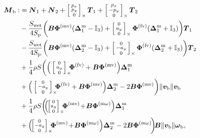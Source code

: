 \begin{align} 
\label{eq:Mb}
 \boldsymbol{M}_{\text{b}} :&=\boldsymbol{N}_{1} + \boldsymbol{N}_{2} + \skewsym{\smallm{p_x\\ p_y\\ 0}} \boldsymbol{T}_{1} + \skewsym{\smallm{p_x\\ - p_y\\ 0}} \boldsymbol{T}_{2}\\
    \nonumber
  &- \frac{S_{\text{wet}}}{4S_{\text{p}}} \bigg( \boldsymbol{B} \boldsymbol{\Phi}^{\text{(mv)}} (\boldsymbol{\Delta}^{\text{m}}_1- \mathbb{I}_{3} ) + \skewsym{\smallm{0 \\ a_y \\ 0}} \boldsymbol{\Phi}^{\text{(fv)}} (\boldsymbol{\Delta}^{\text{m}}_1 +\mathbb{I}_{3} ) \bigg) \boldsymbol{T}_{1} \\
    \nonumber
  & - \frac{S_{\text{wet}}}{4S_{\text{p}}} \bigg( \boldsymbol{B} \boldsymbol{\Phi}^{\text{(mv)}} (\boldsymbol{\Delta}^{\text{m}}_2 - \mathbb{I}_{3} ) +  \skewsym{\smallm{0 \\ - a_y \\ 0}} \boldsymbol{\Phi}^{\text{(fv)}} (\boldsymbol{\Delta}^{\text{m}}_2 + \mathbb{I}_{3}) \bigg) \boldsymbol{T}_{2} \\
    \nonumber
  & + \frac{1}{4} \rho S  \bigg( \Big(\skewsym{\smallm{0 \\ a_y \\ 0}} \!\!\! \boldsymbol{\Phi}^{\text{(fv)}}  + \boldsymbol{B} \boldsymbol{\Phi}^{\text{(mv)}} \Big) \boldsymbol{\Delta}^{\text{m}}_1 \\
    \nonumber
  &  + \Big( \skewsym{\smallm{0 \\ - a_y \\ 0}} \!\!\! \boldsymbol{\Phi}^{\text{(fv)}} + \boldsymbol{B} \boldsymbol{\Phi}^{\text{(mv)}}  \Big) \boldsymbol{\Delta}^{\text{m}}_2 - 2 \boldsymbol{B} \boldsymbol{\Phi}^{\text{(mv)}}  \bigg) \lVert \boldsymbol{v_{\text{b}}} \rVert \boldsymbol{v_{\text{b}}} \\
    \nonumber
  & +\frac{1}{4} \rho S \bigg(\!\! \Big(\!\! \skewsym{\!\smallm{0 \\ a_y \\ 0}\!}\!\!\! \boldsymbol{\Phi}^{\text{(mv)}} \! + \! \boldsymbol{B} \boldsymbol{\Phi}^{\text{(m$\omega$)}} \Big) \boldsymbol{\Delta}^{\text{m}}_1 \\
    \nonumber
  & +  \Big(\!\! \skewsym{\!\smallm{0 \\ - a_y \\ 0}\!} \!\!\! \boldsymbol{\Phi}^{\text{(mv)}} \! + \! \boldsymbol{B} \boldsymbol{\Phi}^{\text{(m$\omega$)}}  \Big) \boldsymbol{\Delta}^{\text{m}}_2 - 2 \boldsymbol{B} \boldsymbol{\Phi}^{\text{(m$\omega$)}}\!  \bigg)\!  \boldsymbol{B}  \lVert \boldsymbol{v_{\text{b}}} \rVert  \boldsymbol{\omega}_{\text{b}} ,
\end{align}

